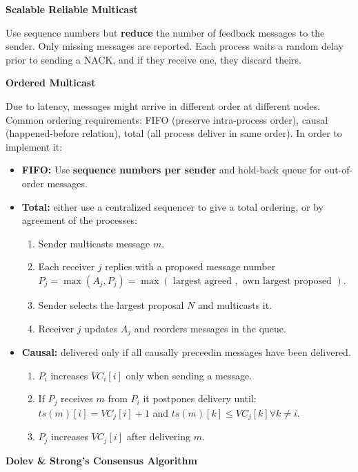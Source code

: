 \documentclass[a4paper, 10pt, twocolumn]{article}
\begin{document}
    \textbf{Scalable Reliable Multicast}

    Use sequence numbers but \textbf{reduce} the number of feedback messages to the sender.
    Only missing messages are reported.
    Each process waits a random delay prior to sending a NACK, and if they receive one, they discard theirs.

    \textbf{Ordered Multicast}

    Due to latency, messages might arrive in different order at different nodes.
    Common ordering requirements: FIFO (preserve intra-process order), causal (happened-before relation), total (all process deliver in same order).
    In order to implement it:
    \begin{itemize}
        \item \textbf{FIFO:} Use \textbf{sequence numbers per sender} and hold-back queue for out-of-order messages.
        \item \textbf{Total:} either use a centralized sequencer to give a total ordering, or by agreement of the processes:
        \begin{enumerate}
            \item Sender multicasts message $m$.
            \item Each receiver $j$ replies with a proposed message number $P_j = \max(A_j, P_j) = \max(\text{ largest agreed }, \text{ own largest proposed })$.
            \item Sender selects the largest proposal $N$ and multicasts it.
            \item Receiver $j$ updates $A_j$ and reorders messages in the queue.
        \end{enumerate}
        \item \textbf{Causal:} delivered only if all causally preceedin messages have been delivered.
        \begin{enumerate}
            \item $P_i$ increases $VC_i[i]$ only when sending a message.
            \item If $P_j$ receives $m$ from $P_i$ it postpones delivery until: $ts(m)[i] = VC_j[i] + 1$ and $ts(m)[k] \leq VC_j[k] \forall k \neq i$.
            \item $P_j$ increases $VC_j[i]$ after delivering $m$.
        \end{enumerate}
    \end{itemize}

    \textbf{Dolev \& Strong's Consensus Algorithm}
\end{document}
